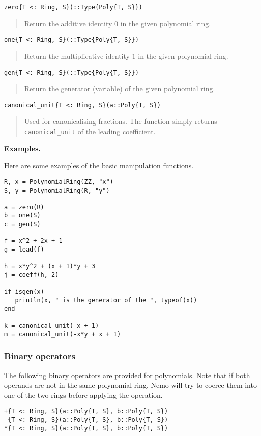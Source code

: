 \documentclass[a4paper,10pt]{article}
\newcommand{\code}{\lstinline}
\newcommand{\desc}[1]{\vspace{-3mm}\begin{quote}#1\end{quote}}
\begin{document}
{{{\begin{lstlisting}
zero{T <: Ring, S}(::Type{Poly{T, S}})
\end{lstlisting}

\desc{Return the additive identity $0$ in the given polynomial ring.}

\begin{lstlisting}
one{T <: Ring, S}(::Type{Poly{T, S}})
\end{lstlisting}

\desc{Return the multiplicative identity $1$ in the given polynomial ring.}

\begin{lstlisting}
gen{T <: Ring, S}(::Type{Poly{T, S}})
\end{lstlisting}

\desc{Return the generator (variable) of the given polynomial ring.}

\begin{lstlisting}
canonical_unit{T <: Ring, S}(a::Poly{T, S})
\end{lstlisting}

\desc{Used for canonicalising fractions. The function simply returns
\code{canonical_unit} of the leading coefficient.}

\textbf{Examples.}

Here are some examples of the basic manipulation functions.

\begin{lstlisting}
R, x = PolynomialRing(ZZ, "x")
S, y = PolynomialRing(R, "y")

a = zero(R)
b = one(S)
c = gen(S)

f = x^2 + 2x + 1
g = lead(f)

h = x*y^2 + (x + 1)*y + 3
j = coeff(h, 2)

if isgen(x)
   println(x, " is the generator of the ", typeof(x))
end

k = canonical_unit(-x + 1)
m = canonical_unit(-x*y + x + 1)
\end{lstlisting}

\subsubsection{Binary operators}

The following binary operators are provided for polynomials. Note that
if both operands are not in the same polynomial ring, Nemo will try to
coerce them into one of the two rings before applying the operation.

\begin{lstlisting}
+{T <: Ring, S}(a::Poly{T, S}, b::Poly{T, S})
-{T <: Ring, S}(a::Poly{T, S}, b::Poly{T, S})
*{T <: Ring, S}(a::Poly{T, S}, b::Poly{T, S})
\end{lstlisting}

}}}
\end{document}
